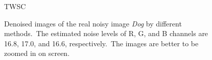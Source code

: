 \begin{figure}
{\begin{minipage}[t]{0.24\textwidth}
{\footnotesize TWSC}
\end{minipage}
}
    \caption{Denoised images of the real noisy image \textsl{Dog} \cite{ncwebsite} by different methods.\ The estimated noise levels of R, G, and B channels are 16.8, 17.0, and 16.6, respectively.\ The images are better to be zoomed in on screen.}
    \label{fig5-7}
\end{figure}


\begin{figure}
    \centering
{}
\end{figure}
